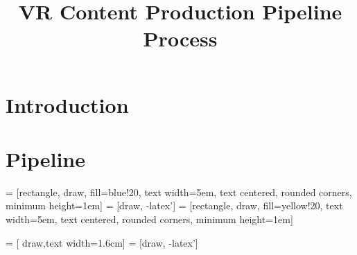\documentclass{article}
\title{VR Content Production Pipeline Process}
\begin{document}
\maketitle

\section*{Introduction}

\section*{Pipeline}

 = [rectangle, draw, fill=blue!20, 
    text width=5em, text centered, rounded corners, minimum height=1em]
 = [draw, -latex']
 = [rectangle, draw, fill=yellow!20, 
    text width=5em, text centered, rounded corners, minimum height=1em]

 = [ draw,text width=1.6cm]
 = [draw, -latex']
\end{document}
